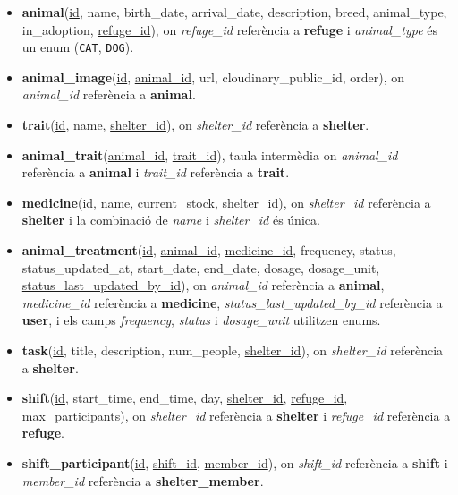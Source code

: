 \documentclass[11pt,a4paper]{report}
\begin{document}
\begin{itemize}
    \item \textbf{animal}(\underline{id}, name, birth\_date, arrival\_date, description, breed, animal\_type, in\_adoption, \underline{refuge\_id}), on \textit{refuge\_id} referència a \textbf{refuge} i \textit{animal\_type} és un enum (\texttt{CAT}, \texttt{DOG}).
    
    \item \textbf{animal\_image}(\underline{id}, \underline{animal\_id}, url, cloudinary\_public\_id, order), on \textit{animal\_id} referència a \textbf{animal}.
    
    \item \textbf{trait}(\underline{id}, name, \underline{shelter\_id}), on \textit{shelter\_id} referència a \textbf{shelter}.
    
    \item \textbf{animal\_trait}(\underline{animal\_id}, \underline{trait\_id}), taula intermèdia on \textit{animal\_id} referència a \textbf{animal} i \textit{trait\_id} referència a \textbf{trait}.
    
    \item \textbf{medicine}(\underline{id}, name, current\_stock, \underline{shelter\_id}), on \textit{shelter\_id} referència a \textbf{shelter} i la combinació de \textit{name} i \textit{shelter\_id} és única.
    
    \item \textbf{animal\_treatment}(\underline{id}, \underline{animal\_id}, \underline{medicine\_id}, frequency, status, status\_updated\_at, start\_date, end\_date, dosage, dosage\_unit, \underline{status\_last\_updated\_by\_id}), on \textit{animal\_id} referència a \textbf{animal}, \textit{medicine\_id} referència a \textbf{medicine}, \textit{status\_last\_updated\_by\_id} referència a \textbf{user}, i els camps \textit{frequency}, \textit{status} i \textit{dosage\_unit} utilitzen enums.
    
    \item \textbf{task}(\underline{id}, title, description, num\_people, \underline{shelter\_id}), on \textit{shelter\_id} referència a \textbf{shelter}.
    
    \item \textbf{shift}(\underline{id}, start\_time, end\_time, day, \underline{shelter\_id}, \underline{refuge\_id}, max\_participants), on \textit{shelter\_id} referència a \textbf{shelter} i \textit{refuge\_id} referència a \textbf{refuge}.
    
    \item \textbf{shift\_participant}(\underline{id}, \underline{shift\_id}, \underline{member\_id}), on \textit{shift\_id} referència a \textbf{shift} i \textit{member\_id} referència a \textbf{shelter\_member}.
    

\end{itemize}
\end{document}
